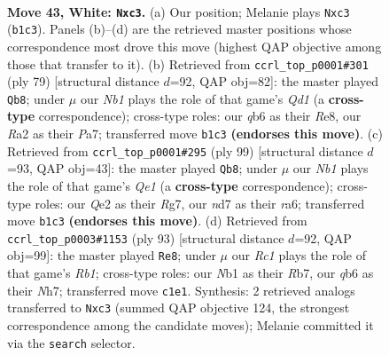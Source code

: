 \documentclass[11pt]{article}
\begin{document}
\clearpage

\begin{figure}[p]\centering
\begin{subfigure}{0.46\textwidth}\centering
\resizebox{\linewidth}{!}{%
\newchessgame
\chessboard[
  setfen={r5k1/3n4/1q1p4/1P2b2p/p4r1P/P1p1N3/R3Q3/1NR3K1 w - - 0 43},
  showmover=false,
  pgfstyle=straightmove, color=movearrow, markmove={b1-c3}
]}
\caption{}
\end{subfigure}\hfill
\begin{subfigure}{0.46\textwidth}\centering
\resizebox{\linewidth}{!}{%
\newchessgame
\chessboard[
  setfen={3qr1k1/p7/1p2Prp1/3P3P/PBp1Q1pn/8/2B5/3R2K1 b - - 0 40},
  showmover=false,
  pgfstyle=straightmove, color=movearrow, markmove={d8-b8}
]}
\caption{}
\end{subfigure}
\\[4pt]
\begin{subfigure}{0.46\textwidth}\centering
\resizebox{\linewidth}{!}{%
\newchessgame
\chessboard[
  setfen={4qr1k/4n1r1/R3Qp1p/3p3P/1p1P1PB1/1P2P3/2p2K2/R7 b - - 1 50},
  showmover=false,
  pgfstyle=straightmove, color=movearrow, markmove={e8-b8}
]}
\caption{}
\end{subfigure}\hfill
\begin{subfigure}{0.46\textwidth}\centering
\resizebox{\linewidth}{!}{%
\newchessgame
\chessboard[
  setfen={1r4k1/1r3p1n/1P4p1/3Np1Pq/4P2P/p1Q5/K6R/6R1 b - - 7 47},
  showmover=false,
  pgfstyle=straightmove, color=movearrow, markmove={b8-e8}
]}
\caption{}
\end{subfigure}
\caption{\textbf{Move 43, White: \texttt{Nxc3}.} (a) Our position; Melanie plays \texttt{Nxc3} (\texttt{b1c3}). Panels (b)--(d) are the retrieved master positions whose correspondence most drove this move (highest QAP objective among those that transfer to it). (b) Retrieved from \texttt{ccrl\_top\_p0001\#301} (ply 79) [structural distance $d$=92, QAP obj=82]: the master played \texttt{Qb8}; under $\mu$ our \emph{Nb1} plays the role of that game's \emph{Qd1} (a \textbf{cross-type} correspondence); cross-type roles: our \emph{q}b6 as their \emph{R}e8, our \emph{R}a2 as their \emph{P}a7; transferred move \texttt{b1c3} \textbf{(endorses this move)}. (c) Retrieved from \texttt{ccrl\_top\_p0001\#295} (ply 99) [structural distance $d$=93, QAP obj=43]: the master played \texttt{Qb8}; under $\mu$ our \emph{Nb1} plays the role of that game's \emph{Qe1} (a \textbf{cross-type} correspondence); cross-type roles: our \emph{Q}e2 as their \emph{R}g7, our \emph{n}d7 as their \emph{r}a6; transferred move \texttt{b1c3} \textbf{(endorses this move)}. (d) Retrieved from \texttt{ccrl\_top\_p0003\#1153} (ply 93) [structural distance $d$=92, QAP obj=99]: the master played \texttt{Re8}; under $\mu$ our \emph{Rc1} plays the role of that game's \emph{Rb1}; cross-type roles: our \emph{N}b1 as their \emph{R}b7, our \emph{q}b6 as their \emph{N}h7; transferred move \texttt{c1e1}. Synthesis: 2 retrieved analogs transferred to \texttt{Nxc3} (summed QAP objective 124, the strongest correspondence among the candidate moves); Melanie committed it via the \texttt{search} selector.}
\label{fig:thought-m84}
\end{figure}
\end{document}
